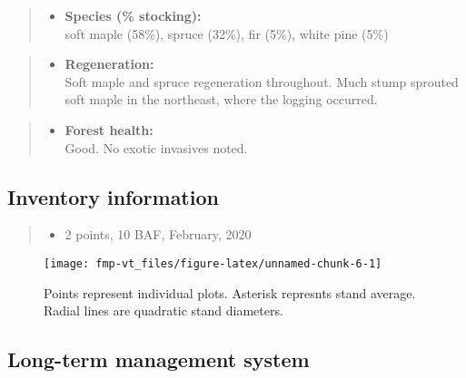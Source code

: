 \documentclass[]{tufte-handout}
\providecommand{\tightlist}{%
  \setlength{\itemsep}{0pt}\setlength{\parskip}{0pt}}
\begin{document}
\begin{quote}
\begin{itemize}
\tightlist
\item
  \textbf{Species (\% stocking):}\\
  \vspace{2pt} soft maple (58\%), spruce (32\%), fir (5\%), white pine
  (5\%)
\end{itemize}
\end{quote}

\begin{quote}
\begin{itemize}
\tightlist
\item
  \textbf{Regeneration:}\\
  \vspace{2pt} Soft maple and spruce regeneration throughout. Much stump
  sprouted soft maple in the northeast, where the logging occurred.
\end{itemize}
\end{quote}

\begin{quote}
\begin{itemize}
\tightlist
\item
  \textbf{Forest health:}\\
  \vspace{2pt} Good. No exotic invasives noted.
\end{itemize}
\end{quote}

\subsection{Inventory information}\label{inventory-information}

\begin{quote}
\begin{itemize}
\tightlist
\item
  2 points, 10 BAF, February, 2020
\end{itemize}
\end{quote}

\begin{figure}
\texttt{[image: fmp-vt\_files/figure-latex/unnamed-chunk-6-1]} \caption[Points represent individual plots]{Points represent individual plots. Asterisk represnts stand average. Radial lines are quadratic stand diameters.}\label{fig:unnamed-chunk-6}
\end{figure}

\subsection{Long-term management
system}\label{long-term-management-system}
\end{document}
